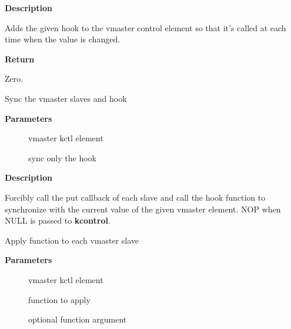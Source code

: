 \documentclass[a4paper,8pt,english]{sphinxmanual}
\begin{document}
\textbf{Description}

Adds the given hook to the vmaster control element so that it's called
at each time when the value is changed.

\textbf{Return}

Zero.

\begin{fulllineitems}
\label{sound/kernel-api/alsa-driver-api:c.snd_ctl_sync_vmaster}
Sync the vmaster slaves and hook

\end{fulllineitems}


\textbf{Parameters}
\begin{description}
\item[{}] \leavevmode
vmaster kctl element

\item[{}] \leavevmode
sync only the hook

\end{description}

\textbf{Description}

Forcibly call the put callback of each slave and call the hook function
to synchronize with the current value of the given vmaster element.
NOP when NULL is passed to \textbf{kcontrol}.

\begin{fulllineitems}
\label{sound/kernel-api/alsa-driver-api:c.snd_ctl_apply_vmaster_slaves}
Apply function to each vmaster slave

\end{fulllineitems}


\textbf{Parameters}
\begin{description}
\item[{}] \leavevmode
vmaster kctl element

\item[{}] \leavevmode
function to apply

\item[{}] \leavevmode
optional function argument

\end{description}
\end{document}
